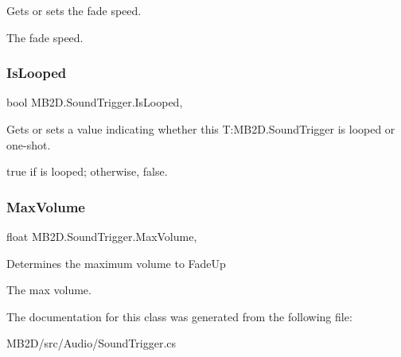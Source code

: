 Gets or sets the fade speed. 

The fade speed.\hypertarget{class_m_b2_d_1_1_sound_trigger_a5b2cdaf1ced61a86af6a6b133e028a2f}{}\label{class_m_b2_d_1_1_sound_trigger_a5b2cdaf1ced61a86af6a6b133e028a2f} 
\subsubsection{\texorpdfstring{Is\+Looped}{IsLooped}}
{\footnotesize\ttfamily bool M\+B2\+D.\+Sound\+Trigger.\+Is\+Looped\hspace{0.3cm}{\ttfamily [get]}, {\ttfamily [set]}}



Gets or sets a value indicating whether this T\+:\+M\+B2\+D.\+Sound\+Trigger is looped or one-\/shot. 

{\ttfamily true} if is looped; otherwise, {\ttfamily false}.\hypertarget{class_m_b2_d_1_1_sound_trigger_a9b9555d5350b4f541e72adcee8f71e27}{}\label{class_m_b2_d_1_1_sound_trigger_a9b9555d5350b4f541e72adcee8f71e27} 
\subsubsection{\texorpdfstring{Max\+Volume}{MaxVolume}}
{\footnotesize\ttfamily float M\+B2\+D.\+Sound\+Trigger.\+Max\+Volume\hspace{0.3cm}{\ttfamily [get]}, {\ttfamily [set]}}



Determines the maximum volume to Fade\+Up 

The max volume.

The documentation for this class was generated from the following file\+:\begin{DoxyCompactItemize}
\item 
M\+B2\+D/src/\+Audio/Sound\+Trigger.\+cs\end{DoxyCompactItemize}
